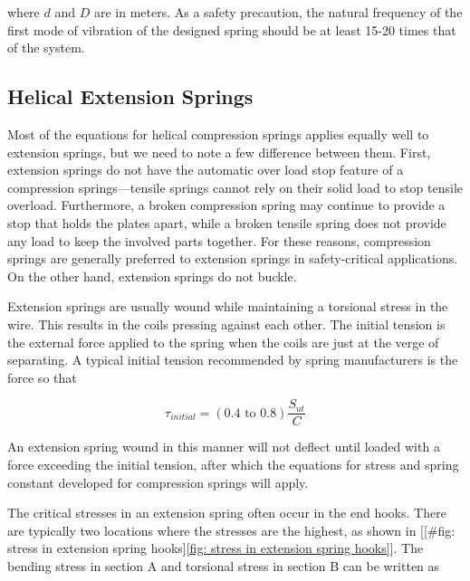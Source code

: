 \documentclass[a4paper,openany,12pt]{book}
\begin{document}
{{where \(d\) and \(D\) are in meters. As a safety precaution, the natural
frequency of the first mode of vibration of the designed spring should
be at least 15-20 times that of the system.

\subsection{Helical Extension Springs}
\label{helical-extension-springs}
Most of the equations for helical compression springs applies equally
well to extension springs, but we need to note a few difference between
them. First, extension springs do not have the automatic over load stop
feature of a compression springs---tensile springs cannot rely on their
solid load to stop tensile overload. Furthermore, a broken compression
spring may continue to provide a stop that holds the plates apart, while
a broken tensile spring does not provide any load to keep the involved
parts together. For these reasons, compression springs are generally
preferred to extension springs in safety-critical applications. On the
other hand, extension springs do not buckle.

Extension springs are usually wound while maintaining a torsional stress
in the wire. This results in the coils pressing against each other. The
initial tension is the external force applied to the spring when the
coils are just at the verge of separating. A typical initial tension
recommended by spring manufacturers is the force so that

$$\tau_{initial} = (0.4 \text{ to } 0.8)\frac{S_{ut}}{C}$$

An extension spring wound in this manner will not deflect until loaded
with a force exceeding the initial tension, after which the equations
for stress and spring constant developed for compression springs will
apply.

The critical stresses in an extension spring often occur in the end
hooks. There are typically two locations where the stresses are the
highest, as shown in
[[\#fig: stress in extension spring hooks]\ref{fig: stress in extension spring hooks}].
The bending stress in section A and torsional stress in section B can be
written as

}}
\end{document}
